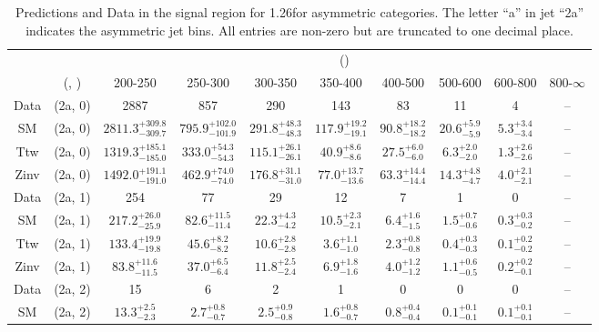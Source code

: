 \begin{table}[h!]
\tiny
\centering
\caption{Predictions and Data in the signal region for 1.26\ifb for asymmetric categories. The letter ``a'' in jet \eg ``2a''  indicates the asymmetric jet bins. All entries are non-zero but are truncated to one decimal place.\label{tab:predall_sig_comb_asym}}
\begin{tabular}
{cccccccccc}
	\hline\hline
	&	& \multicolumn{8}{c}{\scalht (\gev)}\\ 
	&	 (\njet, \nb) & 200-250 & 250-300 & 300-350 & 350-400 & 400-500 & 500-600 & 600-800 & 800-$\infty$ \\ [0.8ex] 
\hline
	Data & (2a, 0) & 2887 & 857 & 290 & 143 & 83 & 11 & 4 & -- \\[0.5ex] 
	SM & (2a, 0) & $2811.3^{+ 309.8 }_{- 309.7 }$ & $795.9^{+ 102.0 }_{- 101.9 }$ & $291.8^{+ 48.3 }_{- 48.3 }$ & $117.9^{+ 19.2 }_{- 19.1 }$ & $90.8^{+ 18.2 }_{- 18.2 }$ & $20.6^{+ 5.9 }_{- 5.9 }$ & $5.3^{+ 3.4 }_{- 3.4 }$ & -- \\[0.5ex] 
	Ttw & (2a, 0) & $1319.3^{+ 185.1 }_{- 185.0 }$ & $333.0^{+ 54.3 }_{- 54.3 }$ & $115.1^{+ 26.1 }_{- 26.1 }$ & $40.9^{+ 8.6 }_{- 8.6 }$ & $27.5^{+ 6.0 }_{- 6.0 }$ & $6.3^{+ 2.0 }_{- 2.0 }$ & $1.3^{+ 2.6 }_{- 2.6 }$ & -- \\[0.5ex] 
	Zinv & (2a, 0) & $1492.0^{+ 191.1 }_{- 191.0 }$ & $462.9^{+ 74.0 }_{- 74.0 }$ & $176.8^{+ 31.1 }_{- 31.0 }$ & $77.0^{+ 13.7 }_{- 13.6 }$ & $63.3^{+ 14.4 }_{- 14.4 }$ & $14.3^{+ 4.8 }_{- 4.7 }$ & $4.0^{+ 2.1 }_{- 2.1 }$ & -- \\[0.5ex] 
	Data & (2a, 1) & 254 & 77 & 29 & 12 & 7 & 1 & 0 & -- \\[0.5ex] 
	SM & (2a, 1) & $217.2^{+ 26.0 }_{- 25.9 }$ & $82.6^{+ 11.5 }_{- 11.4 }$ & $22.3^{+ 4.3 }_{- 4.2 }$ & $10.5^{+ 2.3 }_{- 2.1 }$ & $6.4^{+ 1.6 }_{- 1.5 }$ & $1.5^{+ 0.7 }_{- 0.6 }$ & $0.3^{+ 0.3 }_{- 0.2 }$ & -- \\[0.5ex] 
	Ttw & (2a, 1) & $133.4^{+ 19.9 }_{- 19.8 }$ & $45.6^{+ 8.2 }_{- 8.2 }$ & $10.6^{+ 2.8 }_{- 2.8 }$ & $3.6^{+ 1.1 }_{- 1.0 }$ & $2.3^{+ 0.8 }_{- 0.8 }$ & $0.4^{+ 0.3 }_{- 0.3 }$ & $0.1^{+ 0.2 }_{- 0.2 }$ & -- \\[0.5ex] 
	Zinv & (2a, 1) & $83.8^{+ 11.6 }_{- 11.5 }$ & $37.0^{+ 6.5 }_{- 6.4 }$ & $11.8^{+ 2.5 }_{- 2.4 }$ & $6.9^{+ 1.8 }_{- 1.6 }$ & $4.0^{+ 1.2 }_{- 1.2 }$ & $1.1^{+ 0.6 }_{- 0.5 }$ & $0.2^{+ 0.2 }_{- 0.1 }$ & -- \\[0.5ex] 
	Data & (2a, 2) & 15 & 6 & 2 & 1 & 0 & 0 & 0 & -- \\[0.5ex] 
	SM & (2a, 2) & $13.3^{+ 2.5 }_{- 2.3 }$ & $2.7^{+ 0.8 }_{- 0.7 }$ & $2.5^{+ 0.9 }_{- 0.8 }$ & $1.6^{+ 0.8 }_{- 0.7 }$ & $0.8^{+ 0.4 }_{- 0.4 }$ & $0.1^{+ 0.1 }_{- 0.1 }$ & $0.1^{+ 0.1 }_{- 0.1 }$ & -- \\[0.5ex] 

\end{tabular}
\end{table}
